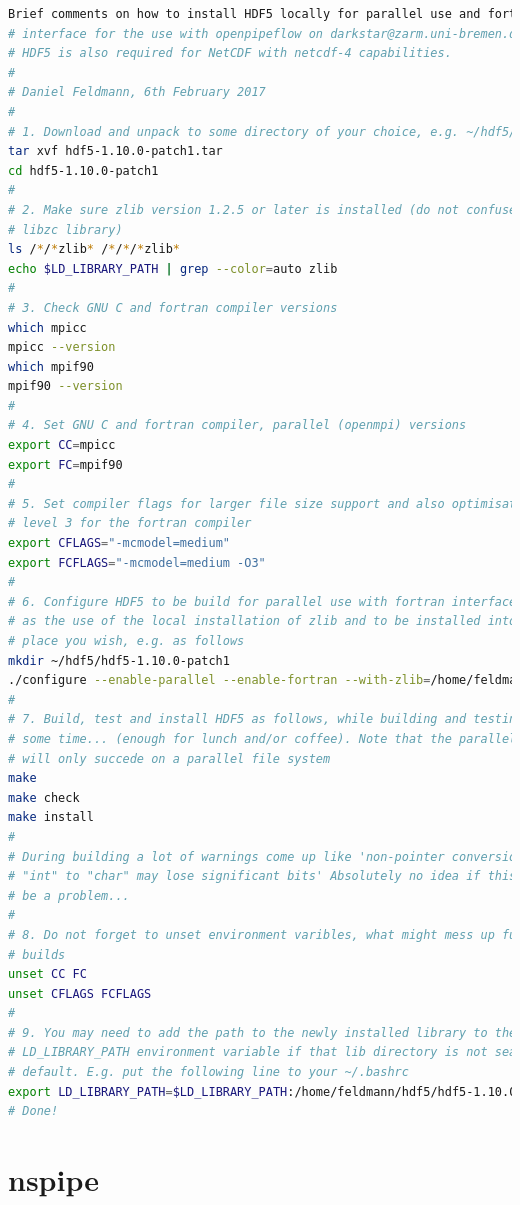 \documentclass[a4paper, 11pt, DIV=11]{scrartcl}
\begin{document}
\begin{lstlisting}[language=bash]
 Brief comments on how to install HDF5 locally for parallel use and fortran
# interface for the use with openpipeflow on darkstar@zarm.uni-bremen.de
# HDF5 is also required for NetCDF with netcdf-4 capabilities.
#
# Daniel Feldmann, 6th February 2017
# 
# 1. Download and unpack to some directory of your choice, e.g. ~/hdf5/build/.
tar xvf hdf5-1.10.0-patch1.tar
cd hdf5-1.10.0-patch1
#
# 2. Make sure zlib version 1.2.5 or later is installed (do not confuse with
# libzc library)
ls /*/*zlib* /*/*/*zlib*
echo $LD_LIBRARY_PATH | grep --color=auto zlib
#
# 3. Check GNU C and fortran compiler versions
which mpicc
mpicc --version
which mpif90
mpif90 --version
#
# 4. Set GNU C and fortran compiler, parallel (openmpi) versions
export CC=mpicc
export FC=mpif90
#
# 5. Set compiler flags for larger file size support and also optimisation
# level 3 for the fortran compiler
export CFLAGS="-mcmodel=medium"
export FCFLAGS="-mcmodel=medium -O3"
#
# 6. Configure HDF5 to be build for parallel use with fortran interface, as well
# as the use of the local installation of zlib and to be installed into some
# place you wish, e.g. as follows
mkdir ~/hdf5/hdf5-1.10.0-patch1
./configure --enable-parallel --enable-fortran --with-zlib=/home/feldmann/zlib/zlib-1.2.11 --prefix=/home/feldmann/hdf5/hdf5-1.10.0-patch1
#
# 7. Build, test and install HDF5 as follows, while building and testing take quite
# some time... (enough for lunch and/or coffee). Note that the parallel tests
# will only succede on a parallel file system
make
make check
make install
#
# During building a lot of warnings come up like 'non-pointer conversion from
# "int" to "char" may lose significant bits' Absolutely no idea if this might
# be a problem...
#
# 8. Do not forget to unset environment varibles, what might mess up future
# builds
unset CC FC
unset CFLAGS FCFLAGS
#
# 9. You may need to add the path to the newly installed library to the
# LD_LIBRARY_PATH environment variable if that lib directory is not searched by
# default. E.g. put the following line to your ~/.bashrc
export LD_LIBRARY_PATH=$LD_LIBRARY_PATH:/home/feldmann/hdf5/hdf5-1.10.0-patch1/lib
# Done!
\end{lstlisting}


\section{nspipe}
\label{sec:nspipe}
\end{document}
